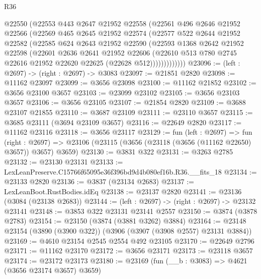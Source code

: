 \begin{lexlean}{R36}
\begin{coremodule}
            @22550
            (@22553
              @443
              @2647
              @21952
              @22558
              (@22561
                @496
                @2646
                @21952
                @22566
                (@22569
                  @465
                  @2645
                  @21952
                  @22574
                  (@22577
                    @522
                    @2644
                    @21952
                    @22582
                    (@22585
                      @624
                      @2643
                      @21952
                      @22590
                      (@22593
                        @1368
                        @2642
                        @21952
                        @22598
                        (@22601
                          @2636
                          @2641
                          @21952
                          @22606
                          (@22610
                            @513
                            @780
                            @2745
                            @22616
                            @21952
                            @22620
                            @22625
                            (@22628 @512)))))))))))))
@23096 := (left : @2697) -> (right : @2697) -> @3083
@23097 := @21851 @2820
@23098 := @11162 @23097
@23099 := @3656 @23098
@23100 := @11162 @21852
@23102 := @3656 @23100 @3657
@23103 := @23099 @23102
@23105 := @3656 @23103 @3657
@23106 := @3656 @23105
@23107 := @21854 @2820
@23109 := @3688 @23107 @21855
@23110 := @3687 @23109
@23111 := @23110 @3657
@23115 := @3685 @23111 (@3694 @23109 @3657)
@23116 := @22649 @2820
@23117 := @11162 @23116
@23118 := @3656 @23117
@23129 := fun (left : @2697) =>
  fun (right : @2697) => @23106 (@23115 (@3656 (@23118 (@3656 (@11162 @22650) @3657)) @3657) @3659)
@23130 := @3831 @322
@23131 := @3263 @2785
@23132 := @23130 @23131
@23133 := LexLeanPreserve.C15766f65095e36f396bd9d4b080ef16b.R36.__fits_18
@23134 := @23133 @2820
@23136 := @3837 (@23134 @2683)
@23137 := LexLeanBoot.RustBodies.idEq
@23138 := @23137 @2820
@23141 := @23136 (@3084 (@23138 @2683))
@23144 := (left : @2697) -> (right : @2697) -> @23132 @23141
@23148 := @3853 @322 @23131 @23141 @2557
@23150 := @3874 (@3878 @2783)
@23154 := @23150 (@3874 (@3881 @3262) @3884)
@23164 := @23148 @23154 (@3890 (@3900 @322)) (@3906 (@3907 (@3908 @2557) @23131 @3884))
@23169 := @4610 @23154 @2545 @2554 @492 @23105
@23170 := @22649 @2796
@23171 := @11162 @23170
@23172 := @3656 @23171
@23173 := @23118 @3657
@23174 := @23172 @23173
@23180 := @23169 (fun (__b : @3083) => @4621 (@3656 @23174 @3657) @3659)

\end{coremodule}
\end{lexlean}
